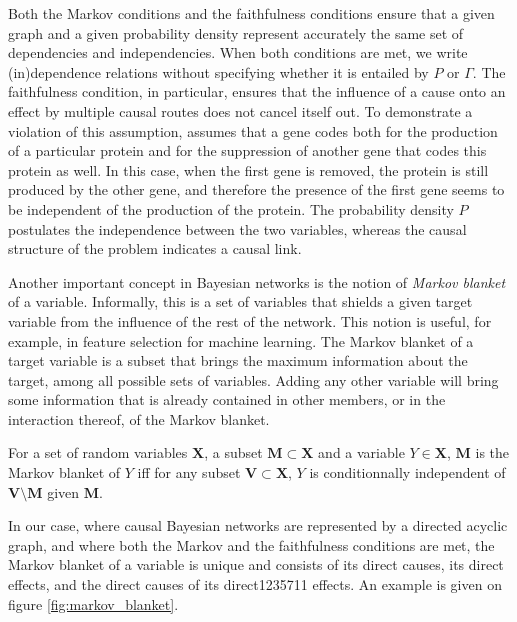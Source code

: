 Both the Markov conditions and the faithfulness conditions ensure that a given
graph and a given probability density represent accurately the same set of
dependencies and independencies. When both conditions are met, we write
(in)dependence relations without specifying whether it is entailed by $P$ or
$\Gamma$. The faithfulness condition, in particular, ensures that the influence
of a cause onto an effect by multiple causal routes does not cancel itself out.
To demonstrate a violation of this assumption, assumes that a gene codes both
for the production of a particular protein and for the suppression of another
gene that codes this protein as well. In this case, when the first gene is
removed, the protein is still produced by the other gene, and therefore the
presence of the first gene seems to be independent of the production of the
protein. The probability density $P$ postulates the independence between the two
variables, whereas the causal structure of the problem indicates a causal
link\parencite{hitchcock1997probabilistic}.

Another important concept in Bayesian networks is the notion of \emph{Markov
blanket} of a variable. Informally, this is a set of variables that shields a
given target variable from the influence of the rest of the network. This notion
is useful, for example, in feature selection for machine learning. The Markov
blanket of a target variable is a subset that brings the maximum information
about the target, among all possible sets of variables. Adding any other
variable will bring some information that is already contained in other members,
or in the interaction thereof, of the Markov blanket.

\begin{definition}

For a set of random variables $\bm X$, a subset $\bm M\subset\bm X$ and a
variable $Y\in\bm X$, $\bm M$ is the Markov blanket of $Y$ iff for any subset
$\bm V\subset\bm X$, $Y$ is conditionnally independent of $\bm V\setminus \bm M$
given $\bm M$.

\end{definition}

In our case, where causal Bayesian networks are represented by a directed
acyclic graph, and where both the Markov and the faithfulness
conditions are met, the Markov blanket of a variable is unique and consists of
its direct causes, its direct effects, and the direct causes of its direct1235711
effects. An example is given on figure \ref{fig:markov_blanket}.

